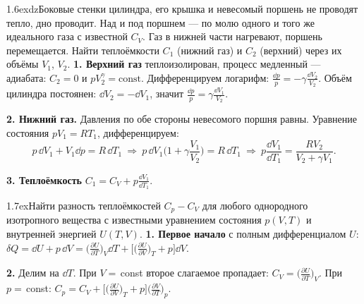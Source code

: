\begin{problem}{1.6}{exdz}{Боковые стенки цилиндра, его крышка и невесомый поршень не проводят тепло, дно проводит. Над и под поршнем — по молю одного и того же
идеального газа с известной $C_V$. Газ в нижней части нагревают, поршень перемещается. Найти теплоёмкости $C_1$ (нижний газ) и $C_2$ (верхний) через их объёмы $V_1$, $V_2$.}
\textbf{1. Верхний газ} теплоизолирован, процесс медленный — адиабата: $C_2=0$ и $pV_2^\gamma=\text{const}$.
Дифференцируем логарифм: $\frac{\dd p}{p}=-\gamma\frac{\dd V_2}{V_2}$. Объём цилиндра постоянен: $\dd V_2=-\dd V_1$, значит $\frac{\dd p}{p}=\gamma\frac{\dd V_1}{V_2}$.

\textbf{2. Нижний газ.} Давления по обе стороны невесомого поршня равны. Уравнение состояния $pV_1=RT_1$, дифференцируем:
\[p\,\dd V_1+V_1\dd p=R\,\dd T_1\ \Rightarrow\ p\,\dd V_1\Big(1+\gamma\frac{V_1}{V_2}\Big)=R\,\dd T_1\ \Rightarrow\ p\frac{\dd V_1}{\dd T_1}=\frac{RV_2}{V_2+\gamma V_1}.\]

\textbf{3. Теплоёмкость} $C_1=C_V+p\frac{\dd V_1}{\dd T_1}$.
\end{problem}

\begin{problem}{1.7}{ex}{Найти разность теплоёмкостей $C_p-C_V$ для любого однородного изотропного вещества с известными уравнением состояния $p(V,T)$ и внутренней энергией $U(T,V)$.}
\textbf{1. Первое начало} с полным дифференциалом $U$:
$\delta Q=\dd U+p\,\dd V=\big(\frac{\partial U}{\partial T}\big)_V\dd T+\big[\big(\frac{\partial U}{\partial V}\big)_T+p\big]\dd V$.

\textbf{2.} Делим на $\dd T$. При $V=$\,const второе слагаемое пропадает: $C_V=\big(\frac{\partial U}{\partial T}\big)_V$.
При $p=$\,const: $C_p=C_V+\big[\big(\frac{\partial U}{\partial V}\big)_T+p\big]\big(\frac{\partial V}{\partial T}\big)_p$.
\end{problem}


